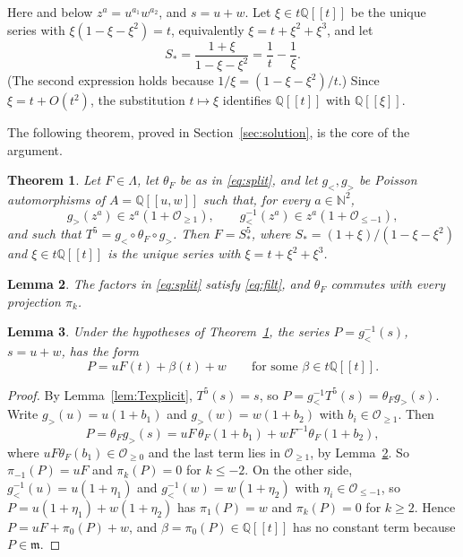 \documentclass[11pt]{article}
\newtheorem{theorem}{Theorem}[section]
\newtheorem{lemma}[theorem]{Lemma}
\theoremstyle{definition}
\theoremstyle{remark}
\numberwithin{equation}{section}
\newcommand{\Q}{\mathbb{Q}}
\newcommand{\N}{\mathbb{N}}
\newcommand{\ps}[1]{\Q[\![#1]\!]}
\newcommand{\m}{\mathfrak{m}}
\newcommand{\Oge}[1]{\mathcal{O}_{\geq #1}}
\newcommand{\Ole}[1]{\mathcal{O}_{\leq #1}}
\newcommand{\gl}{g_{<}}
\newcommand{\gr}{g_{>}}
\newcommand{\Sst}{S_{*}}
\begin{document}
Here and below $z^a=u^{a_1}w^{a_2}$, and $s=u+w$.
Let $\xi\in t\ps{t}$ be the unique series with $\xi(1-\xi-\xi^2)=t$,
equivalently $\xi=t+\xi^2+\xi^3$, and let
\[
  \Sst=\frac{1+\xi}{1-\xi-\xi^2}=\frac1t-\frac1\xi .
\]
(The second expression holds because $1/\xi=(1-\xi-\xi^2)/t$.) Since
$\xi=t+O(t^2)$, the substitution $t\mapsto\xi$ identifies $\ps{t}$ with
$\ps{\xi}$.


The following theorem, proved in Section~\ref{sec:solution}, is the core
of the argument.

\begin{theorem}\label{thm:mainlemma}
Let $F\in\Lambda$, let $\theta_F$ be as in \eqref{eq:split}, and let
$\gl,\gr$ be Poisson automorphisms of $A=\ps{u,w}$ such that, for every
$a\in\N^2$,
\begin{equation}\label{eq:filt}
  \gr(z^a)\in z^a(1+\Oge1),\qquad \gl^{-1}(z^a)\in z^a(1+\Ole{-1}),
\end{equation}
and such that $T^5=\gl\circ\theta_F\circ\gr$. Then $F=\Sst^{5}$, where
$\Sst=(1+\xi)/(1-\xi-\xi^2)$ and $\xi\in t\ps{t}$ is the unique series
with $\xi=t+\xi^2+\xi^3$.
\end{theorem}

\begin{lemma}\label{lem:filt}
The factors in \eqref{eq:split} satisfy \eqref{eq:filt}, and $\theta_F$
commutes with every projection $\pi_k$.
\end{lemma}



\begin{lemma}\label{lem:extract}
Under the hypotheses of Theorem~\ref{thm:mainlemma}, the series
$P=\gl^{-1}(s)$, $s=u+w$, has the form
\[
  P=uF(t)+\beta(t)+w\qquad\text{for some }\beta\in t\ps{t}.
\]
\end{lemma}

\begin{proof}
By Lemma~\ref{lem:Texplicit}, $T^5(s)=s$, so
$P=\gl^{-1}T^5(s)=\theta_F\gr(s)$. Write $\gr(u)=u(1+b_1)$ and
$\gr(w)=w(1+b_2)$ with $b_i\in\Oge1$. Then
\[
  P=\theta_F\gr(s)=uF\,\theta_F(1+b_1)+wF^{-1}\theta_F(1+b_2),
\]
where $uF\theta_F(b_1)\in\Oge0$ and the last term lies in $\Oge1$, by
Lemma~\ref{lem:filt}. So $\pi_{-1}(P)=uF$ and $\pi_k(P)=0$ for $k\leq-2$.
On the other side, $\gl^{-1}(u)=u(1+\eta_1)$ and $\gl^{-1}(w)=w(1+\eta_2)$ with
$\eta_i\in\Ole{-1}$, so $P=u(1+\eta_1)+w(1+\eta_2)$ has $\pi_1(P)=w$ and
$\pi_k(P)=0$ for $k\geq2$. Hence $P=uF+\pi_0(P)+w$, and
$\beta=\pi_0(P)\in\ps{t}$ has no constant term because $P\in\m$.
\end{proof}
\end{document}
